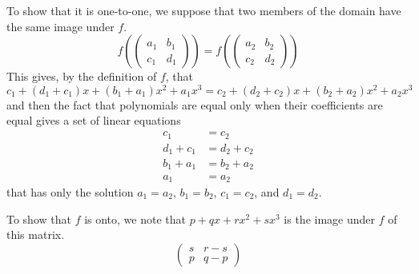\begin{exercises}
\begin{answer}
\begin{exparts}
        To show that it is one-to-one, we suppose that two members of the
        domain have the same image under $f$.
        \begin{equation*}
          f(\begin{pmatrix}
              a_1  &b_1  \\
              c_1  &d_1
            \end{pmatrix})
          =f(\begin{pmatrix}
              a_2  &b_2  \\
              c_2  &d_2
            \end{pmatrix})
        \end{equation*}
        This gives, by the definition of $f$, that 
        $c_1+(d_1+c_1)x+(b_1+a_1)x^2+a_1x^3
          =c_2+(d_2+c_2)x+(b_2+a_2)x^2+a_2x^3$
        and then the fact that polynomials are equal only when their
        coefficients are equal gives a set of linear equations
        \begin{align*}
          c_1      &=  c_2      \\
          d_1+c_1  &=  d_2+c_2  \\
          b_1+a_1  &=  b_2+a_2  \\
          a_1      &=  a_2
        \end{align*}
        that has only the solution $a_1=a_2$, $b_1=b_2$, $c_1=c_2$, and 
        $d_1=d_2$.

        To show that $f$ is onto, we note that $p+qx+rx^2+sx^3$ is the image
        under $f$ of this matrix.
        \begin{equation*}
          \begin{pmatrix}
            s  &r-s   \\
            p  &q-p
          \end{pmatrix}
        \end{equation*}


\end{exparts}
\end{answer}
\end{exercises}
